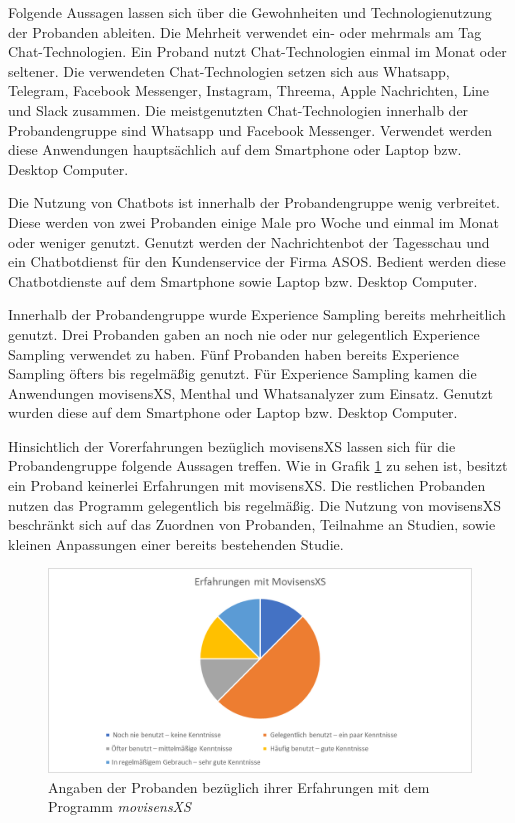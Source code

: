 Folgende Aussagen lassen sich über die Gewohnheiten und Technologienutzung der Probanden ableiten. Die Mehrheit verwendet ein- oder mehrmals am Tag Chat-Technologien. Ein Proband nutzt Chat-Technologien 
einmal im Monat oder seltener. Die verwendeten Chat-Technologien setzen sich aus Whatsapp, Telegram, Facebook Messenger, Instagram, Threema, Apple Nachrichten, Line und Slack zusammen. Die meistgenutzten Chat-Technologien innerhalb der Probandengruppe sind Whatsapp und Facebook Messenger. Verwendet werden diese Anwendungen hauptsächlich auf dem Smartphone oder Laptop bzw. Desktop Computer. 

Die Nutzung von Chatbots ist innerhalb der Probandengruppe wenig verbreitet. Diese werden von zwei Probanden einige Male pro Woche und einmal im Monat oder weniger genutzt. Genutzt werden der Nachrichtenbot der Tagesschau und ein Chatbotdienst für den Kundenservice der Firma ASOS. Bedient werden diese Chatbotdienste auf dem Smartphone sowie Laptop bzw. Desktop Computer. 

Innerhalb der Probandengruppe wurde Experience Sampling bereits mehrheitlich genutzt. Drei Probanden gaben an noch nie oder nur gelegentlich Experience Sampling verwendet zu haben. Fünf Probanden haben bereits Experience Sampling öfters bis regelmäßig genutzt. Für Experience Sampling kamen die Anwendungen movisensXS, Menthal und Whatsanalyzer zum Einsatz. Genutzt wurden diese auf dem Smartphone oder Laptop bzw. Desktop Computer. 

Hinsichtlich der Vorerfahrungen bezüglich movisensXS lassen sich für die Probandengruppe folgende Aussagen treffen. Wie in Grafik \ref{movisensXSErfahrung} zu sehen ist, besitzt ein Proband keinerlei Erfahrungen mit movisensXS. Die restlichen Probanden nutzen das Programm gelegentlich bis regelmäßig. Die Nutzung von movisensXS beschränkt sich auf das Zuordnen von Probanden, Teilnahme an Studien, sowie kleinen Anpassungen einer bereits bestehenden Studie. 

\begin{figure}[h]
\centering
\includegraphics[width=1\textwidth]{pictures/diagramme/movi}
\caption{Angaben der Probanden bezüglich ihrer Erfahrungen mit dem Programm \emph{movisensXS}}
\label{movisensXSErfahrung}
\end{figure}

